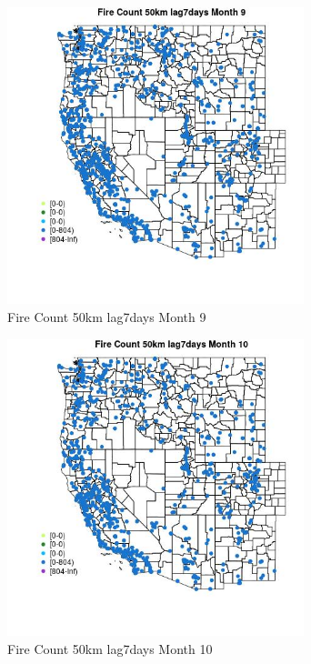 \begin{figure} 
\centering  
\includegraphics[width=0.77\textwidth]{Code_Outputs/Report_ML_input_PM25_Step4_part_f_de_duplicated_aveswNAs_MapObsMo9Fire_Count_50km_lag7days.jpg} 
\caption{\label{fig:Report_ML_input_PM25_Step4_part_f_de_duplicated_aveswNAsMapObsMo9Fire_Count_50km_lag7days}Fire Count 50km lag7days Month 9} 
\end{figure} 
 

\clearpage 

\begin{figure} 
\centering  
\includegraphics[width=0.77\textwidth]{Code_Outputs/Report_ML_input_PM25_Step4_part_f_de_duplicated_aveswNAs_MapObsMo10Fire_Count_50km_lag7days.jpg} 
\caption{\label{fig:Report_ML_input_PM25_Step4_part_f_de_duplicated_aveswNAsMapObsMo10Fire_Count_50km_lag7days}Fire Count 50km lag7days Month 10} 
\end{figure} 
 

